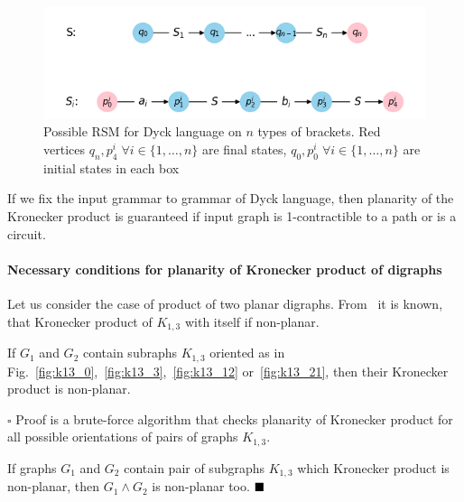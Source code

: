 \begin{figure}[h]

  \begin{center}  
  \includegraphics[scale = 0.4]{dyck_n.png}
  \end{center}

  \caption{Possible RSM for Dyck language on $n$ types of brackets. Red vertices $q_n, p^i_4 \; \forall i \in \{1, \ldots, n\}$  are final states, $q_0, p^i_0 \; \forall i \in \{1, \ldots, n\}$ are initial states in each box}

  \label{fig:dyck_n}

\end{figure}

\begin{corollary}
\label{cor:path_circuit}
If we fix the input grammar to grammar of Dyck language, then planarity of the Kronecker product is guaranteed if input graph is 1-contractible to a path or is a circuit.
\end{corollary}

\paragraph{Necessary conditions for planarity of Kronecker product of digraphs}

Let us consider the case of product of two planar digraphs. From~\citep{farzan1977kronecker} it is known, that Kronecker product of $K_{1, 3}$ with itself if non-planar.

\begin{proposition}
If $G_1$ and $G_2$ contain subraphs $K_{1, 3}$ oriented as in Fig.~\ref{fig:k13_0},~\ref{fig:k13_3},~\ref{fig:k13_12} or~\ref{fig:k13_21}, then their Kronecker product is non-planar. 
\end{proposition}

$\square$
Proof is a brute-force algorithm that checks planarity of Kronecker product for all possible orientations of pairs of graphs $K_{1, 3}$.

If graphs $G_1$ and $G_2$ contain pair of subgraphs $K_{1, 3}$ which Kronecker product is non-planar, then $G_1 \wedge G_2$ is non-planar too.
$\hfill\blacksquare$

